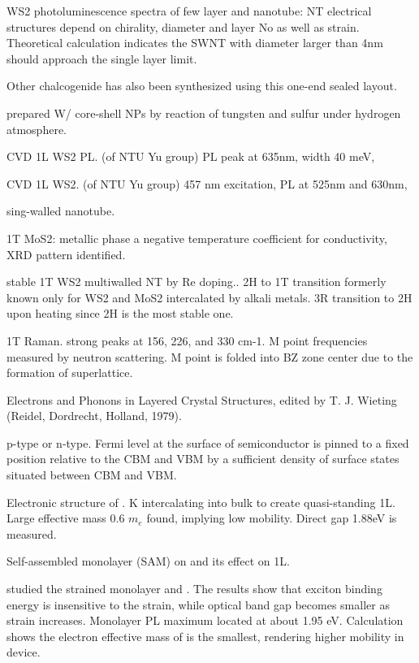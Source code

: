 WS2 photoluminescence spectra of few layer and nanotube:
NT electrical structures depend on chirality, diameter and layer No as well as strain. Theoretical calculation indicates the SWNT with diameter larger than 4nm should approach the single layer limit.\cite{Ghorbani-Asl2013}

Other chalcogenide has also been synthesized using this one-end sealed layout.\cite{Mukherjee2013}

\citeauthor{Zou2007} prepared W/ core-shell NPs by reaction of tungsten and sulfur under hydrogen atmosphere.\cite{Zou2007}

CVD 1L WS2 PL.\cite{Peimyoo2013} (of NTU Yu group) PL peak at 635nm, width 40 meV, 

CVD 1L WS2.\cite{Cong2013} (of NTU Yu group) 457 nm excitation, PL at 525nm and 630nm, 

 sing-walled nanotube.\cite{Xiao2014}

1T MoS2: metallic phase a negative temperature coefficient for conductivity, XRD pattern identified. \cite{Wypych1992}

stable 1T WS2 multiwalled NT by Re doping.\cite{Enyashin2011}. 2H to 1T transition formerly known only for WS2 and MoS2 intercalated by alkali metals. 3R transition to 2H upon heating since 2H is the most stable one.

1T  Raman.\cite{Yang1991} strong peaks at 156, 226, and 330 cm-1. M point frequencies measured by neutron scattering. M point is folded into BZ zone center due to the formation of superlattice.

Electrons and Phonons in Layered Crystal Structures, edited by T. J. Wieting (Reidel, Dordrecht, Holland, 1979).

 p-type or n-type.  Fermi level at the surface of semiconductor is pinned to a fixed position relative to the CBM and VBM by a sufficient density of surface states situated between CBM and VBM. \cite{Baglio1983}

Electronic structure of .\cite{Eknapakul2014} K intercalating into bulk to create quasi-standing 1L. Large effective mass 0.6 $m_e$ found, implying low mobility. Direct gap 1.88eV is measured.

Self-assembled monolayer (SAM) on  and its effect on  1L.\cite{Najmaei2014}

\citeauthor{Shi2013} studied the strained monolayer  and . The results show that exciton binding energy is insensitive to the strain, while optical band gap becomes smaller as strain increases. Monolayer  PL maximum located at about 1.95 eV. Calculation shows the electron effective mass of  is the smallest, rendering higher mobility in device.\cite{Shi2013}

